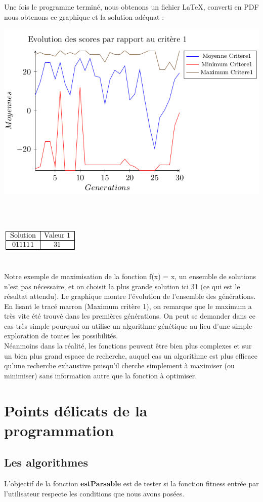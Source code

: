\documentclass[a4paper,11pt]{article}
\begin{document}
			Une fois le programme terminé, nous obtenons un fichier LaTeX, converti en PDF nous obtenons ce graphique et la solution adéquat :\\
			\centerline{\includegraphics[scale=0.5]{Graphe.png}}\\\\
			\centerline{\includegraphics[scale=0.5]{Resultats.png}}\\
			
			Notre exemple de maximisation de la fonction f(x) = x, un ensemble de solutions n’est pas nécessaire, et on choisit la plus grande solution ici 31 (ce qui est le résultat attendu).
			Le graphique montre l’évolution de l’ensemble des générations.
			En lisant le tracé marron (Maximum critère 1), on remarque que le maximum a très vite été trouvé dans les premières générations.
			On peut se demander dans ce cas très simple pourquoi on utilise un algorithme génétique au lieu d’une simple exploration de toutes les possibilités.\\
			Néanmoins dans la réalité, les fonctions peuvent être bien plus complexes et sur un bien plus grand espace de recherche, auquel cas un algorithme est plus efficace qu’une recherche exhaustive puisqu’il cherche simplement à maximiser (ou minimiser) sans information autre que la fonction à optimiser.
		
		
		\section{Points délicats de la programmation}
		\subsection{Les algorithmes }
			L’objectif de la fonction \textbf{estParsable} est de tester si la fonction fitness entrée par l’utilisateur respecte les conditions que nous avons posées.\\
\end{document}
